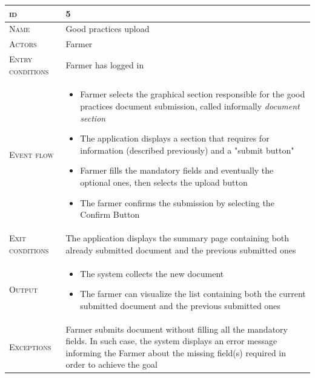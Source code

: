 \begin{table}[H]
    \centering
    \begin{tabular}{|l|p{}|}
        \hline %
    	\textsc{id}                 &   5\\
    	\hline %
    	\textsc{Name}               &   Good practices upload\\
    	\hline %
    	\textsc{Actors}             &   Farmer\\
    	\hline %
    	\textsc{Entry conditions}   &   Farmer has logged in\\
    	\hline %
    	\textsc{Event flow}         &   %
            	                        \begin{itemize}
                                    	    \item Farmer selects the graphical section responsible for the good practices document submission, called informally \textit{document section}
                                    		\item The application displays a section that requires for information (described previously) and a "submit button"
                                    		\item Farmer fills the mandatory fields and eventually the optional ones, then selects the upload button
                                    		\item The farmer confirms the submission by selecting the Confirm Button
                                        \end{itemize}\\
        \hline %
        \textsc{Exit conditions}    &  The application displays the summary page containing both already submitted document and the previous submitted ones\\
    	\hline %
    	\textsc{Output}             &  \begin{itemize}
    	    \item The system collects the new document
    	    \item The farmer can visualize the list containing both the current submitted document and the previous submitted ones
    	\end{itemize}\\
    	\hline %
    	\textsc{Exceptions}         &   Farmer submits document without filling all the mandatory fields. In such case, the system displays an error message informing the Farmer about the missing field(s) required in order to achieve the goal\\
    	\hline %
        

\end{tabular}
\end{table}
